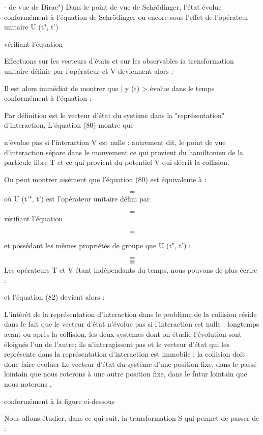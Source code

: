 - de vue de Dirac")
Dans le point de vue de Schrödinger, l'état  évolue
conformément à l'équation de Schrödinger
ou encore sous l'effet de l'opérateur unitaire U (t", t')

 vérifiant l'équation

Effectuons sur les vecteurs d'états et sur les observables ia trensformation
unitaire définie par l'opérateur  et V deviennent
alors :

Il est alors immédiat de montrer que | y (t) > évolue dans le temps conformément
à l'équation :


Par définition  est le vecteur d'état du système dans
la "représentation" d'interaction, L'équation (80) montre que

 n'évolue pas si l'interaction V est nulle : autrement
dit, le point de vue d'interaction sépare dans le mouvement ce
qui provient du hamiltonien de la particule libre T et ce qui
provient du potentiel V qui décrit la collision.

On peut montrer aisément que l'équation (80) est équivalente à :

\[
\tag{81}=
\]
où U (t'", t') est l'opérateur unitaire défini par

\[
\tag{82}=
\]
vérifiant l'équation

\[
\tag{83}=
\]

et possédant les mêmes propriétés de groupe que U (t", t') :

\[
\tag{84-a}=
\]
\[
\tag{84-b}=
\]
\[
\tag{84-c}=
\]
Les opérateurs T et V étant indépendants du temps, nous pouvons
de plus écrire :

et l'équation (82) devient alors :

% 
L'intérêt de la représentation d'interaction dans le problème de la collision
réside dans le fait que le vecteur d'état n'évolue
pas si l'interaction est nulle : longtemps avant ou après la collision,
les deux systèmes dont on étudie l'évolution sont éloignés l'un de
l'autre; ils n'interagissent pas et le vecteur d'état qui les représente dans
la représentation d'interaction est immobile : la collision
doit donc faire évoluer Le vecteur d'état du système d'une position
fixe, dans le passé lointain que nous roterons  à une
autre position fixe, dans le futur lointain que nous noterons ,

conformément à la figure ci-dessous

Nous allons étudier, dans ce qui suit, la transformation S qui permet de
passer de :

